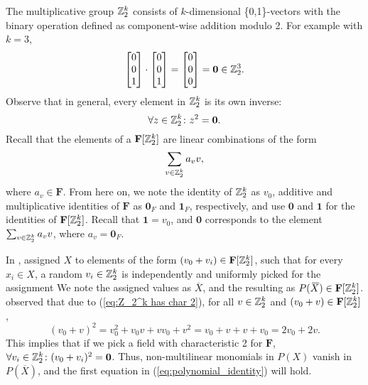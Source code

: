 The multiplicative group $\mathbb Z_2^k$ consists of $k$-dimensional \{0,1\}-vectors 
with the binary operation defined as component-wise addition modulo 2. 
For example with $k = 3$, 
\[
  \begin{bmatrix} 0 \\ 0 \\ 1 \end{bmatrix} \cdot 
  \begin{bmatrix} 0 \\ 0 \\ 1 \end{bmatrix} =
  \begin{bmatrix} 0 \\ 0 \\ 0 \end{bmatrix} = \mathbf{0} \in \mathbb Z_2^3.
\]
Observe that in general, every element in $\mathbb Z_2^k$ is its own inverse:
\begin{equation}
  \label{eq:Z_2^k has char 2}
  \forall z \in \mathbb Z_2^k \colon z^2 = \mathbf{0}.
\end{equation}
Recall that the elements of a
$\mathbf{F}[\mathbb Z_2^k]$ are linear combinations of the form 
\[
  \displaystyle \sum_{v \in \mathbb Z_2^k}a_v v,
\]
where $a_v \in \mathbf{F}$. From here on, we note the identity of $\mathbb Z_2^k$ as $v_0$, additive and 
multiplicative identities of $\mathbf{F}$ as $\mathbf{0}_F$ and $\mathbf{1}_F$, respectively, and 
use $\mathbf{0}$ and $\mathbf{1}$ for the identities of 
$\mathbf{F}[\mathbb Z_2^k]$. Recall that $\mathbf{1} = v_0$, and
$\mathbf{0}$ corresponds to the element $\sum_{v \in \mathbb Z_2^k}a_v v$, where $a_v =
\mathbf{0}_F$.

In \cite{Koutis08}, \citeauthor{Koutis08} assigned $X$ 
to elements of the form $(v_0 + v_i) \in \mathbf{F}[\mathbb Z_2^k]$, 
such that for every $x_i \in X$, a random $v_i \in \mathbb Z_2^k$ is independently and uniformly 
picked for the assignment 
We note the assigned values as $\overbar{X}$, and the resulting
as $P(\,\overline{\!{X}}) \in \mathbf{F}[\mathbb Z_2^k]$. 
\citeauthor{Koutis08} observed that 
due to (\ref{eq:Z_2^k has char 2}), for all $v \in \mathbb Z_2^k$ and $(v_0 + v) \in \mathbf{F}[\mathbb Z_2^k]$, 
\[
  (v_0 + v)^2 = v_0^2 + v_0v + vv_0 + v^2 = v_0 + v + v + v_0 = 2v_0 + 2v.
\]
This implies that if we pick a field with characteristic 2 for $\mathbf{F}$, 
$\forall v_i \in \mathbb Z_2^k \colon (v_0 + v_i)^2 = \mathbf{0}$. Thus, 
non-multilinear monomials in $P(X)$ vanish in $P(\overbar{X})$, and the 
first equation in (\ref{eq:polynomial_identity}) 
will hold.

